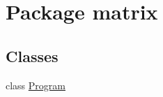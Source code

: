 \hypertarget{namespacematrix}{\section{Package matrix}
\label{namespacematrix}
}
\subsection*{Classes}
\begin{DoxyCompactItemize}
\item 
class \hyperlink{classmatrix_1_1_program}{Program}
\end{DoxyCompactItemize}
